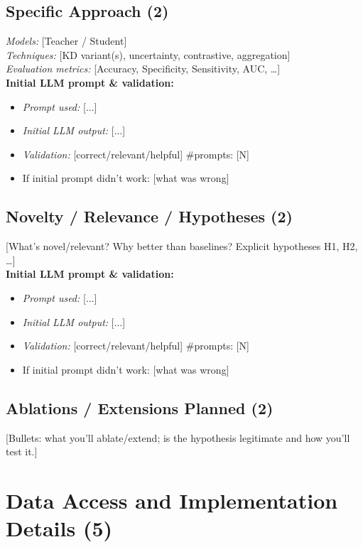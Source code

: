 \documentclass[15pt]{extarticle}
\begin{document}
\subsection*{Specific Approach (2)}
\textit{Models:} [Teacher / Student]\\
\textit{Techniques:} [KD variant(s), uncertainty, contrastive, aggregation]\\
\textit{Evaluation metrics:} [Accuracy, Specificity, Sensitivity, AUC, …]
\\[2pt]
\textbf{Initial LLM prompt \& validation:}
\begin{itemize}
  \item \emph{Prompt used:} [...]
  \item \emph{Initial LLM output:} [...]
  \item \emph{Validation:} [correct/relevant/helpful] \quad \#prompts: [N]
  \item If initial prompt didn’t work: [what was wrong]
\end{itemize}

\subsection*{Novelty / Relevance / Hypotheses (2)}
[What’s novel/relevant? Why better than baselines? Explicit hypotheses H1, H2, …]
\\[2pt]
\textbf{Initial LLM prompt \& validation:}
\begin{itemize}
  \item \emph{Prompt used:} [...]
  \item \emph{Initial LLM output:} [...]
  \item \emph{Validation:} [correct/relevant/helpful] \quad \#prompts: [N]
  \item If initial prompt didn’t work: [what was wrong]
\end{itemize}

\subsection*{Ablations / Extensions Planned (2)}
[Bullets: what you’ll ablate/extend; is the hypothesis legitimate and how you’ll test it.]

\section*{Data Access and Implementation Details (5)}
\end{document}
